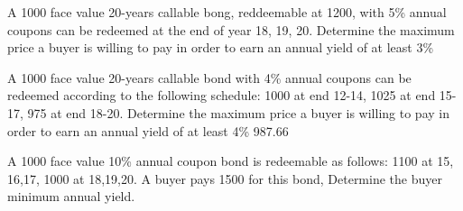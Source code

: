 \documentclass[12pt,a4paper]{article}
\begin{document}
\begin{question} A 1000 face value 20-years callable bong, reddeemable at 1200, with 5\% annual coupons can be redeemed at the end of year 18, 19, 20. Determine the maximum price a buyer is willing to pay in order to earn an annual yield of at least 3\%
\end{question}
%
%


\begin{question} A 1000 face value 20-years callable bond with 4\% annual coupons can be redeemed according to the following schedule:
1000 at end 12-14, 1025 at end 15-17, 975 at end 18-20.
Determine the maximum price a buyer is willing to pay in order to earn an annual yield of at least 4\%
987.66
\end{question}

\begin{question} A 1000 face value 10\% annual coupon bond is redeemable as follows: 1100 at 15, 16,17, 1000 at 18,19,20. A buyer pays 1500 for this bond, Determine the buyer minimum annual yield.
\end{question}
%
%
%
%
%
\end{document}

